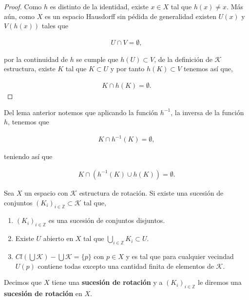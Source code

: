 \documentclass{subfiles}
\begin{document}
\begin{proof}
Como $h$ es distinto de la identidad, existe $x \in X$ tal que $h(x) \neq x$. Más aún, como $X$ es un espacio Hausdorff sin pédida de generalidad existen $U(x)$ y $V(h(x))$ tales que 

	\begin{align*}
    U \cap V  = \emptyset,
	\end{align*}
	
por la continuidad de $h$ se cumple que $h(U) \subset V$, de la definición de $\mathcal{K}$ estructura, existe $K$ tal que $K \subset U$ y por tanto $h(K) \subset V$ tenemos así que,

	\begin{align*}
    K \cap h(K) = \emptyset.
	\end{align*}

\end{proof}

\begin{ob}
Del lema anterior notemos que aplicando la función $h^{-1}$, la inversa de la función $h$, tenemos que

	\begin{align*}
    K \cap h^{-1}(K) = \emptyset,
	\end{align*}

teniendo así  que 

	\begin{align*}
    K \cap (h^{-1}(K) \cup h(K)) = \emptyset.
	\end{align*}
	
\end{ob}


\begin{df}\label{df:Suc_rot}
Sea $X$ un espacio con $\mathcal{K}$ estructura de rotación. Si existe una sucesión de conjuntos $(K_i)_{i\in \mathbb{Z}} \subset \mathcal{K}$ tal que,

	\begin{enumerate}
	\item $(K_i)_{i\in \mathbb{Z}}$ es una sucesión de conjuntos disjuntos. 
	\item Existe $U$ abierto en $X$ tal que $\bigcup_{i\in \mathbb{Z}} K_i \subset U$.
	\item $Cl(\bigcup \mathcal{K})- \bigcup \mathcal{K}=\{p \}$ con $p \in X$ y es tal que para cualquier vecindad $U(p)$ contiene todas excepto una cantidad finita de elementos de $\mathcal{K}.$
	\end{enumerate}

Decimos que $X$ tiene una \textbf{sucesión de rotación} y a $(K_i)_{i\in \mathbb{Z}}$ le diremos una \textbf{sucesión de rotación} en $X$.
\end{df}
\end{document}
